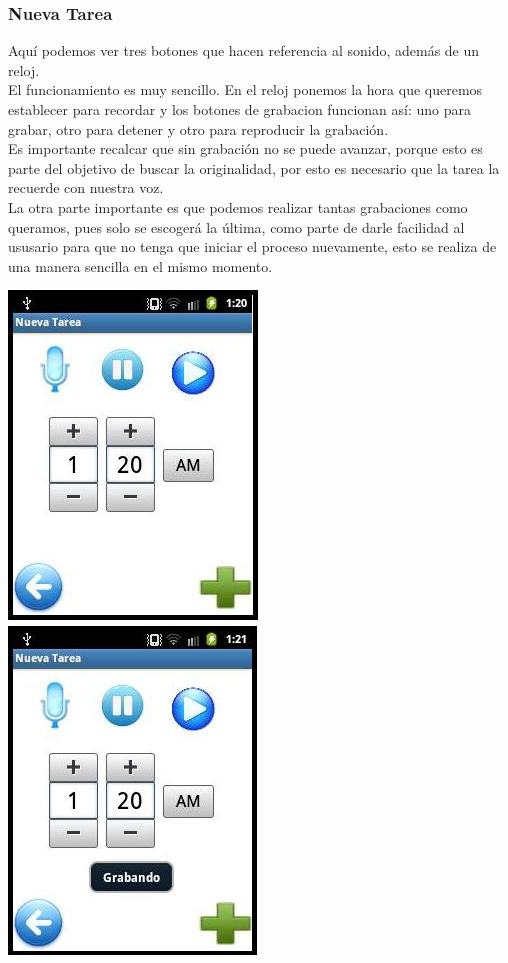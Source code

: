 \documentclass[12pt]{article}
\begin{document}
{{{\begin{flushleft}
\newpage
\subsubsection{Nueva Tarea}
\vspace{0.1in}
Aqu\'i podemos ver tres botones que hacen referencia al sonido, adem\'as de un reloj.\\
El funcionamiento es muy sencillo. En el reloj ponemos la hora que queremos establecer para recordar y los botones de grabacion funcionan así: uno para grabar, otro para detener y otro para reproducir la grabaci\'on.\\
Es importante recalcar que sin grabaci\'on no se puede avanzar, porque esto es parte del objetivo de buscar la originalidad, por esto es necesario que la tarea la recuerde con nuestra voz.\\
La otra parte importante es que podemos realizar tantas grabaciones como queramos, pues solo se escoger\'a la \'ultima, como parte de darle facilidad al ususario para que no tenga que iniciar el proceso nuevamente, esto se realiza de una manera sencilla en el mismo momento.\\

\begin{center}
\vspace{0.5in}
\includegraphics[scale=1.0]{imagenes_android/NuevaTarea1.jpg}
\hspace{0.1in}\includegraphics[scale=1.0]{imagenes_android/NuevaTarea2.jpg}
\end{center}


\end{flushleft}}}}
\end{document}
